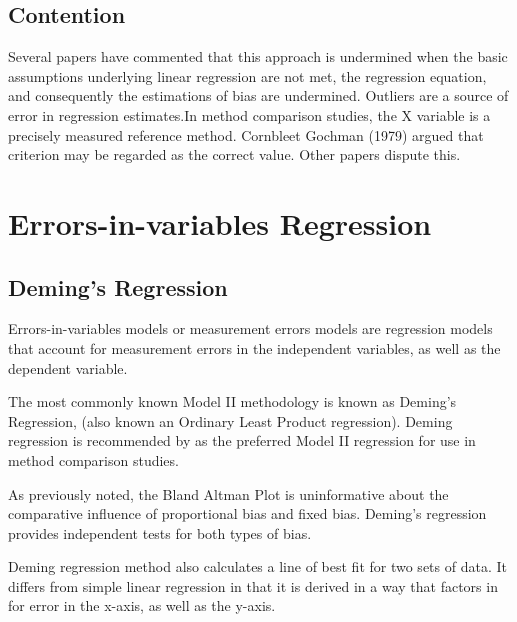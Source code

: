 \documentclass[12pt, a4paper]{report}
\theoremstyle{plain}
\theoremstyle{definition}
\theoremstyle{remark}
\begin{document}



	


\section{Contention }
Several papers have commented that this approach is undermined
when the basic assumptions underlying linear regression are not
met, the regression equation, and consequently the estimations of
bias are undermined. Outliers are a source of error in regression
estimates.In method comparison studies, the X variable is a
precisely measured reference method. Cornbleet Gochman (1979)
argued that criterion may be regarded as the correct value. Other
papers dispute this.







\chapter{Errors-in-variables Regression}





\section{Deming's Regression}

Errors-in-variables models or measurement errors models are regression models that account for measurement errors in the independent variables, as well as the dependent variable.

The most commonly known Model II methodology is known as Deming's Regression, (also known an Ordinary Least Product regression). Deming regression is recommended by \citet*{CornCoch} as the preferred Model II regression for use in method comparison studies. 

As previously noted, the Bland Altman Plot is
uninformative about the comparative influence of proportional bias and fixed bias. Deming's regression provides independent tests for both types of bias.

Deming regression method also calculates a line of best fit for two sets of data. It differs from simple linear regression in that it is derived in a way that factors in for error in the x-axis, as well as the y-axis.
\end{document}

